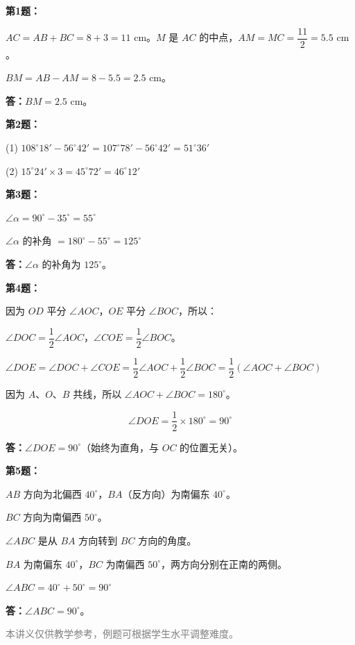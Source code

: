 \documentclass[12pt, a4paper]{ctexart}
\begin{document}
\vspace{10pt}

\begin{knowledgebox}[参考答案]
\textbf{第1题：}

$AC=AB+BC=8+3=11\text{ cm}$。$M$ 是 $AC$ 的中点，$AM=MC=\dfrac{11}{2}=5.5\text{ cm}$。

$BM=AB-AM=8-5.5=2.5\text{ cm}$。

\textbf{答：}$BM=2.5\text{ cm}$。

\medskip

\textbf{第2题：}

(1) $108^\circ18'-56^\circ42'=107^\circ78'-56^\circ42'=51^\circ36'$

(2) $15^\circ24'\times 3=45^\circ72'=46^\circ12'$

\medskip

\textbf{第3题：}

$\angle\alpha=90^\circ-35^\circ=55^\circ$

$\angle\alpha$ 的补角 $=180^\circ-55^\circ=125^\circ$

\textbf{答：}$\angle\alpha$ 的补角为 $125^\circ$。

\medskip

\textbf{第4题：}

因为 $OD$ 平分 $\angle AOC$，$OE$ 平分 $\angle BOC$，所以：

$\angle DOC=\dfrac{1}{2}\angle AOC$，$\angle COE=\dfrac{1}{2}\angle BOC$。

$\angle DOE=\angle DOC+\angle COE=\dfrac{1}{2}\angle AOC+\dfrac{1}{2}\angle BOC=\dfrac{1}{2}(\angle AOC+\angle BOC)$

因为 $A$、$O$、$B$ 共线，所以 $\angle AOC+\angle BOC=180^\circ$。

$$\angle DOE=\frac{1}{2}\times 180^\circ=90^\circ$$

\textbf{答：}$\angle DOE=90^\circ$（始终为直角，与 $OC$ 的位置无关）。

\medskip

\textbf{第5题：}

$AB$ 方向为北偏西 $40^\circ$，$BA$（反方向）为南偏东 $40^\circ$。

$BC$ 方向为南偏西 $50^\circ$。

$\angle ABC$ 是从 $BA$ 方向转到 $BC$ 方向的角度。

$BA$ 为南偏东 $40^\circ$，$BC$ 为南偏西 $50^\circ$，两方向分别在正南的两侧。

$\angle ABC=40^\circ+50^\circ=90^\circ$

\textbf{答：}$\angle ABC=90^\circ$。
\end{knowledgebox}

\vfill
\begin{center}
\small\textcolor{gray}{本讲义仅供教学参考，例题可根据学生水平调整难度。}
\end{center}
\end{document}
